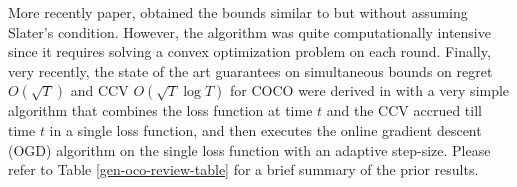 

More recently paper, \citet{guo2022online} obtained the bounds similar to \citet{neely2017online} but without assuming Slater's condition. However, the algorithm \citet{guo2022online} was quite computationally intensive since it requires solving a convex optimization problem on each round. 
Finally, very recently, the state of the art guarantees on simultaneous bounds on regret $O (\sqrt{T})$ and CCV $O (\sqrt{T}\log T)$ for COCO were derived in \cite{Sinha2024} with a very simple algorithm that combines the loss function at time $t$ and the CCV accrued till time $t$ in a single loss function, and then executes the online gradient descent (OGD) algorithm on the single loss function with an adaptive step-size.
Please refer to Table \ref{gen-oco-review-table} for a brief summary of the prior results.



